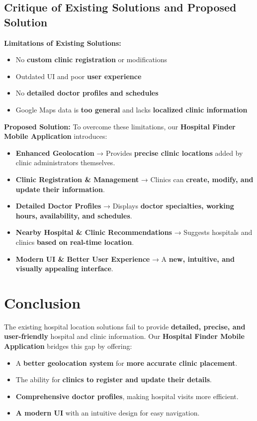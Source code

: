 \documentclass[12pt]{report}
\begin{document}
\subsection{\textbf{Critique of Existing Solutions and Proposed Solution}}  

\textbf{Limitations of Existing Solutions:}  
\begin{itemize}
    \item No \textbf{custom clinic registration} or modifications  
    \item Outdated UI and poor \textbf{user experience}  
    \item No \textbf{detailed doctor profiles and schedules}  
    \item Google Maps data is \textbf{too general} and lacks \textbf{localized clinic information}  
\end{itemize}

\noindent \textbf{Proposed Solution:}  
To overcome these limitations, our \textbf{Hospital Finder Mobile Application} introduces:  
\begin{itemize}
    \item \textbf{Enhanced Geolocation} → Provides \textbf{precise clinic locations} added by clinic administrators themselves.  
    \item \textbf{Clinic Registration \& Management} → Clinics can \textbf{create, modify, and update their information}.  
    \item \textbf{Detailed Doctor Profiles} → Displays \textbf{doctor specialties, working hours, availability, and schedules}.  
    \item \textbf{Nearby Hospital \& Clinic Recommendations} → Suggests hospitals and clinics \textbf{based on real-time location}.  
    \item \textbf{Modern UI \& Better User Experience} → A \textbf{new, intuitive, and visually appealing interface}.  
\end{itemize}

\section{\textbf{Conclusion}} 

The existing hospital location solutions fail to provide \textbf{detailed, precise, and user-friendly} hospital and clinic information. Our \textbf{Hospital Finder Mobile Application} bridges this gap by offering:  
\begin{itemize}
    \item A \textbf{better geolocation system} for \textbf{more accurate clinic placement}.  
    \item The ability for \textbf{clinics to register and update their details}.  
    \item \textbf{Comprehensive doctor profiles}, making hospital visits more efficient.  
    \item \textbf{A modern UI} with an intuitive design for easy navigation.  
\end{itemize}
\end{document}
